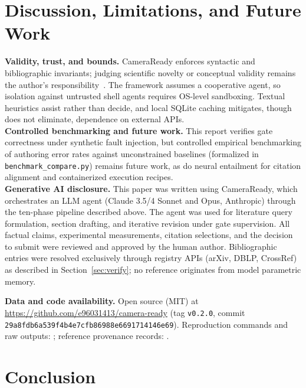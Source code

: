 \documentclass[conference]{IEEEtran}
\begin{document}
\section{Discussion, Limitations, and Future Work}
\label{sec:discuss}

\noindent\textbf{Validity, trust, and bounds.} CameraReady enforces syntactic and bibliographic invariants; judging scientific novelty or conceptual validity remains the author's responsibility~\cite{miyai2026paper}. The framework assumes a cooperative agent, so isolation against untrusted shell agents requires OS-level sandboxing. Textual heuristics assist rather than decide, and local SQLite caching mitigates, though does not eliminate, dependence on external APIs.\\
\noindent\textbf{Controlled benchmarking and future work.} This report verifies gate correctness under synthetic fault injection, but controlled empirical benchmarking of authoring error rates against unconstrained baselines (formalized in \texttt{benchmark\_compare.py}) remains future work, as do neural entailment for citation alignment and containerized execution recipes.\\
\noindent\textbf{Generative AI disclosure.} This paper was written using CameraReady, which orchestrates an LLM agent (Claude 3.5/4 Sonnet and Opus, Anthropic) through the ten-phase pipeline described above. The agent was used for literature query formulation, section drafting, and iterative revision under gate supervision. All factual claims, experimental measurements, citation selections, and the decision to submit were reviewed and approved by the human author. Bibliographic entries were resolved exclusively through registry APIs (arXiv, DBLP, CrossRef) as described in Section~\ref{sec:verify}; no reference originates from model parametric memory.\par\vspace{2pt}
{\footnotesize\raggedright\noindent\textbf{Data and code availability.} Open source (MIT) at \url{https://github.com/e96031413/camera-ready} (tag \texttt{v0.2.0}, commit \texttt{29a8fdb6a539f4b4e7cfb86988e6691714146e69}). Reproduction commands and raw outputs: ; reference provenance records: .\par}

\section{Conclusion}
\end{document}
